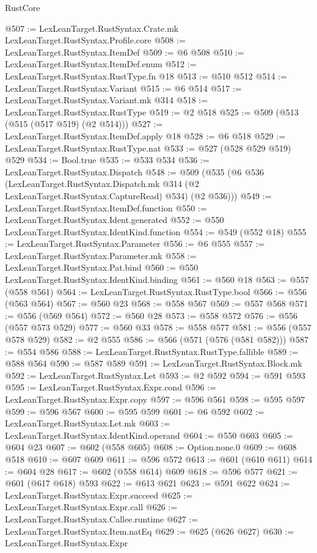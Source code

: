 \begin{lexlean}{RustCore}
\begin{coremodule}
@507 := LexLeanTarget.RustSyntax.Crate.mk LexLeanTarget.RustSyntax.Profile.core
@508 := LexLeanTarget.RustSyntax.ItemDef
@509 := @6 @508
@510 := LexLeanTarget.RustSyntax.ItemDef.enum
@512 := LexLeanTarget.RustSyntax.RustType.fn @18
@513 := @510 @512
@514 := LexLeanTarget.RustSyntax.Variant
@515 := @6 @514
@517 := LexLeanTarget.RustSyntax.Variant.mk @314
@518 := LexLeanTarget.RustSyntax.RustType
@519 := @2 @518
@525 := @509 (@513 (@515 (@517 @519) (@2 @514)))
@527 := LexLeanTarget.RustSyntax.ItemDef.apply @18
@528 := @6 @518
@529 := LexLeanTarget.RustSyntax.RustType.nat
@533 := @527 (@528 @529 @519) @529
@534 := Bool.true
@535 := @533 @534
@536 := LexLeanTarget.RustSyntax.Dispatch
@548 := @509
    (@535
      (@6
        @536
        (LexLeanTarget.RustSyntax.Dispatch.mk @314 (@2 LexLeanTarget.RustSyntax.CaptureRead) @534)
        (@2 @536)))
@549 := LexLeanTarget.RustSyntax.ItemDef.function
@550 := LexLeanTarget.RustSyntax.Ident.generated
@552 := @550 LexLeanTarget.RustSyntax.IdentKind.function
@554 := @549 (@552 @18)
@555 := LexLeanTarget.RustSyntax.Parameter
@556 := @6 @555
@557 := LexLeanTarget.RustSyntax.Parameter.mk
@558 := LexLeanTarget.RustSyntax.Pat.bind
@560 := @550 LexLeanTarget.RustSyntax.IdentKind.binding
@561 := @560 @18
@563 := @557 (@558 @561)
@564 := LexLeanTarget.RustSyntax.RustType.bool
@566 := @556 (@563 @564)
@567 := @560 @23
@568 := @558 @567
@569 := @557 @568
@571 := @556 (@569 @564)
@572 := @560 @28
@573 := @558 @572
@576 := @556 (@557 @573 @529)
@577 := @560 @33
@578 := @558 @577
@581 := @556 (@557 @578 @529)
@582 := @2 @555
@586 := @566 (@571 (@576 (@581 @582)))
@587 := @554 @586
@588 := LexLeanTarget.RustSyntax.RustType.fallible
@589 := @588 @564
@590 := @587 @589
@591 := LexLeanTarget.RustSyntax.Block.mk
@592 := LexLeanTarget.RustSyntax.Let
@593 := @2 @592
@594 := @591 @593
@595 := LexLeanTarget.RustSyntax.Expr.cond
@596 := LexLeanTarget.RustSyntax.Expr.copy
@597 := @596 @561
@598 := @595 @597
@599 := @596 @567
@600 := @595 @599
@601 := @6 @592
@602 := LexLeanTarget.RustSyntax.Let.mk
@603 := LexLeanTarget.RustSyntax.IdentKind.operand
@604 := @550 @603
@605 := @604 @23
@607 := @602 (@558 @605)
@608 := Option.none.{0}
@609 := @608 @518
@610 := @607 @609
@611 := @596 @572
@613 := @601 (@610 @611)
@614 := @604 @28
@617 := @602 (@558 @614) @609
@618 := @596 @577
@621 := @601 (@617 @618) @593
@622 := @613 @621
@623 := @591 @622
@624 := LexLeanTarget.RustSyntax.Expr.succeed
@625 := LexLeanTarget.RustSyntax.Expr.call
@626 := LexLeanTarget.RustSyntax.Callee.runtime
@627 := LexLeanTarget.RustSyntax.Item.natEq
@629 := @625 (@626 @627)
@630 := LexLeanTarget.RustSyntax.Expr

\end{coremodule}
\end{lexlean}

